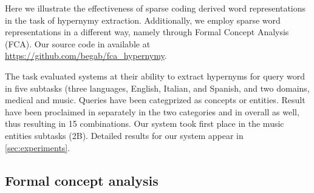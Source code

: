 \documentclass[11pt,a4paper]{article}
\begin{document}
Here we illustrate the effectiveness of sparse coding derived word representations in the task of hypernymy extraction. Additionally, we employ sparse word representations in a different way, namely through Formal Concept Analysis (FCA).
Our source code in available at \url{https://github.com/begab/fca_hypernymy}.




The task \citep{Camacho-Collados:2018} evaluated systems at their ability to
extract hypernyms for query word in five subtasks (three languages, English,
Italian, and Spanish, and two domains, medical and music. Queries have been
categprized as concepts or entities. Result have been proclaimed in separately
in the two categories and in overall as well, thus resulting in 15
combinations.
Our system took first place in the music entities subtasks (2B).
Detailed results for our system appear in \autoref{sec:experiments}.

\subsection{Formal concept analysis}

\newcommand{\ob}{\ensuremath{\mathcal O}}
\newcommand{\at}{\ensuremath{\mathcal A}}
\newcommand{\inci}{\ensuremath{\mathcal I}}
\newcommand{\oaconc}{\ensuremath{\langle O, A\rangle}}
\end{document}
